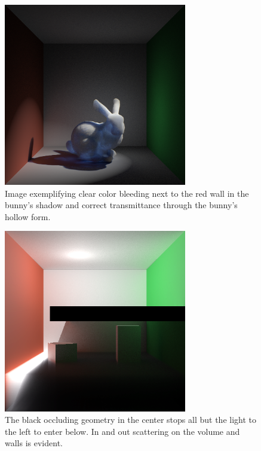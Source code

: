 \documentclass[12pt]{ucthesis}
\begin{document}
\begin{figure}[h!]
    \centering
    \includegraphics[width=80mm]{img/bunny_spot/spot_right_new.png}
    \caption{Image exemplifying clear color bleeding next to the red wall in the bunny's shadow and correct transmittance through the bunny's hollow form.}
\end{figure}

\begin{figure}[h!]
    \centering
    \includegraphics[width=80mm]{img/one_side_corrected.png}
    \caption{The black occluding geometry in the center stops all but the light to the left to enter below.  In and out scattering on the volume and walls is evident.}
\end{figure}
\end{document}
